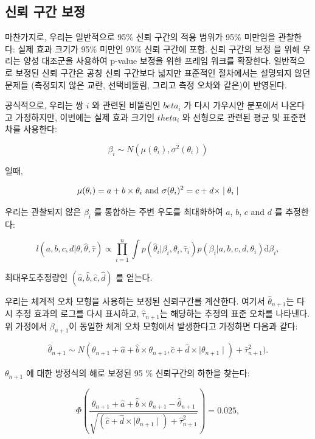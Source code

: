 \documentclass[11pt]{book}
\theoremstyle{definition}
\theoremstyle{definition}
\theoremstyle{definition}
\theoremstyle{remark}
\begin{document}
\subsection{신뢰 구간 보정}\label{--}


마찬가지로, 우리는 일반적으로 95\% 신뢰 구간의 적용 범위가 95\% 미만임을
관찰한다: 실제 효과 크기가 95\% 미만인 95\% 신뢰 구간에 포함. 신뢰
구간의 보정 \citep{schuemie_2018} 을 위해 우리는 양성 대조군을 사용하여
p-value 보정을 위한 프레임 워크를 확장한다. 일반적으로 보정된 신뢰
구간은 공칭 신뢰 구간보다 넓지만 표준적인 절차에서는 설명되지 않던
문제들 (측정되지 않은 교란, 선택비뚤림, 그리고 측정 오차와 같은)이
반영된다.

공식적으로, 우리는 쌍 \(i\) 와 관련된 비뚤림인 \(beta_i\) 가 다시
가우시안 분포에서 나온다고 가정하지만, 이번에는 실제 효과 크기인
\(theta_i\) 와 선형으로 관련된 평균 및 표준편차를 사용한다:

\[\beta_i \sim N(\mu(\theta_i) , \sigma^2(\theta_i))\]

일때,

\[\mu(\theta_i) = a + b \times \theta_i \text{ and } \\
  \sigma(\theta_i) ^2= c + d \times \mid \theta_i \mid\]

우리는 관찰되지 않은 \(\beta_i\) 를 통합하는 주변 우도를 최대화하여
\(a\), \(b\), \(c\) and \(d\) 를 추정한다:

\[l(a,b,c,d | \theta, \hat{\theta}, \hat{\tau} ) \propto \prod_{i=1}^{n}\int p(\hat{\theta}_i|\beta_i, \theta_i, \hat{\tau}_i)p(\beta_i|a,b,c,d,\theta_i) \text{d}\beta_i ,\]

최대우도추정량인 \((\hat{a}, \hat{b}, \hat{c}, \hat{d})\) 를 얻는다.

우리는 체계적 오차 모형을 사용하는 보정된 신뢰구간를 계산한다. 여기서
\(\hat{\theta}_{n+1}\)는 다시 추정 효과의 로그를 다시 표시하고,
\(\hat{\tau}_{n+1}\)는 해당하는 추정의 표준 오차를 나타낸다. 위 가정에서
\(\beta_{n+1}\)이 동일한 체계 오차 모형에서 발생한다고 가정하면 다음과
같다:

\[\hat{\theta}_{n+1} \sim N(
\theta_{n+1} + \hat{a} + \hat{b} \times \theta_{n+1},
\hat{c} + \hat{d} \times \mid \theta_{n+1} \mid) + \hat{\tau}_{n+1}^2) .\]

\(\theta_{n+1}\) 에 대한 방정식의 해로 보정된 95 \% 신뢰구간의 하한을
찾는다:

\[\Phi\left(
\frac{\theta_{n+1} + \hat{a} + \hat{b} \times \theta_{n+1}-\hat{\theta}_{n+1}}
{\sqrt{(\hat{c} + \hat{d} \times \mid \theta_{n+1} \mid) + \hat{\tau}_{n+1}^2}}
\right) = 0.025 ,\]
\end{document}
